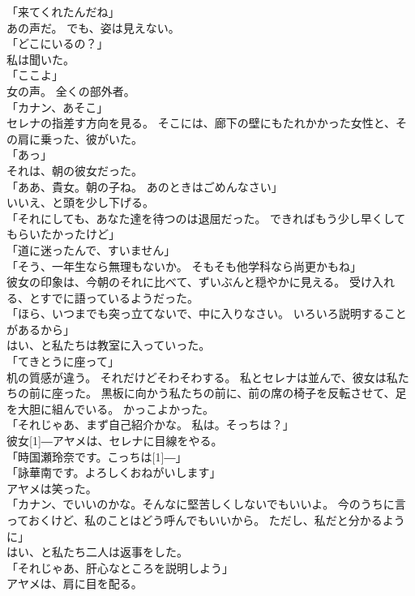 \documentclass[../IHMain]{subfiles}
\begin{document}
「来てくれたんだね」\\
あの声だ。
でも、姿は見えない。\\
「どこにいるの？」\\
私は聞いた。\\
「ここよ」\\
女の声。
全くの部外者。\\
「カナン、あそこ」\\
セレナの指差す方向を見る。
そこには、廊下の壁にもたれかかった女性と、その肩に乗った、彼がいた。\\
「あっ」\\
それは、朝の彼女だった。\\
「ああ、貴女。朝の子ね。
あのときはごめんなさい」\\
いいえ、と頭を少し下げる。\\
「それにしても、あなた達を待つのは退屈だった。
できればもう少し早くしてもらいたかったけど」\\
「道に迷ったんで、すいません」\\
「そう、一年生なら無理もないか。
そもそも他学科なら尚更かもね」\\
彼女の印象は、今朝のそれに比べて、ずいぶんと穏やかに見える。
受け入れる、とすでに語っているようだった。\\
「ほら、いつまでも突っ立てないで、中に入りなさい。
いろいろ説明することがあるから」\\
はい、と私たちは教室に入っていった。\\
「てきとうに座って」\\
机の質感が違う。
それだけどそわそわする。
私とセレナは並んで、彼女は私たちの前に座った。
黒板に向かう私たちの前に、前の席の椅子を反転させて、足を大胆に組んでいる。
かっこよかった。\\
「それじゃあ、まず自己紹介かな。
私は。そっちは？」\\
彼女\scalebox{3}[1]{―}アヤメは、セレナに目線をやる。\\
「時国瀬玲奈です。こっちは\scalebox{3}[1]{―}」\\
「詠華南です。よろしくおねがいします」\\
アヤメは笑った。\\
「カナン、でいいのかな。そんなに堅苦しくしないでもいいよ。
今のうちに言っておくけど、私のことはどう呼んでもいいから。
ただし、私だと分かるように」\\
はい、と私たち二人は返事をした。\\
「それじゃあ、肝心なところを説明しよう」\\
アヤメは、肩に目を配る。\\
\end{document}
